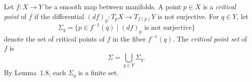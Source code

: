 Let $f \colon X \to Y$ be a smooth map between manifolds.
A point $p \in X$ is a \emph{critical point} of $f$ if the differential
$(df)_p \colon T_p X \to T_{f(p)} Y$ is not surjective.
For $q \in Y$, let
$$\Sigma_q = \{ p \in f^{-1}(q) \mid (df)_p \text{ is not surjective} \}$$
denote the set of critical points of $f$ in the fiber $f^{-1}(q)$.
The \emph{critical point set} of $f$ is
$$\Sigma = \bigcup_{q \in Y} \Sigma_q.$$
By Lemma~1.8, each $\Sigma_q$ is a finite set.
